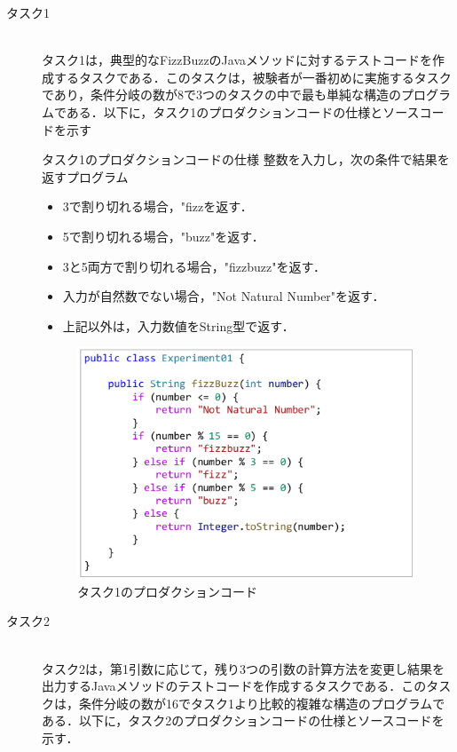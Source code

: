 \documentclass[12pt]{jarticle} %
\begin{document}
\begin{description}
\item[タスク1]~\\
タスク1は，典型的なFizzBuzzのJavaメソッドに対するテストコードを作成するタスクである．このタスクは，被験者が一番初めに実施するタスクであり，条件分岐の数が8で3つのタスクの中で最も単純な構造のプログラムである．以下に，タスク1のプロダクションコードの仕様とソースコードを示す

\begin{itembox}[l]{タスク1のプロダクションコードの仕様}
整数を入力し，次の条件で結果を返すプログラム
\begin{itemize}
\item 3で割り切れる場合，"fizzを返す．
\item 5で割り切れる場合，"buzz"を返す．
\item 3と5両方で割り切れる場合，"fizzbuzz"を返す．
\item 入力が自然数でない場合，"Not Natural Number"を返す．
\item 上記以外は，入力数値をString型で返す．
\end{itemize}
\end{itembox}

\begin{figure}[htbp]
  \begin{center}
    \includegraphics[clip,width=10cm]{E1.pdf}
    \caption{タスク1のプロダクションコード}
    \label{E1}
  \end{center}
\end{figure}

\item[タスク2]~\\
タスク2は，第1引数に応じて，残り3つの引数の計算方法を変更し結果を出力するJavaメソッドのテストコードを作成するタスクである．このタスクは，条件分岐の数が16でタスク1より比較的複雑な構造のプログラムである．以下に，タスク2のプロダクションコードの仕様とソースコードを示す．


\end{description}
\end{document}
